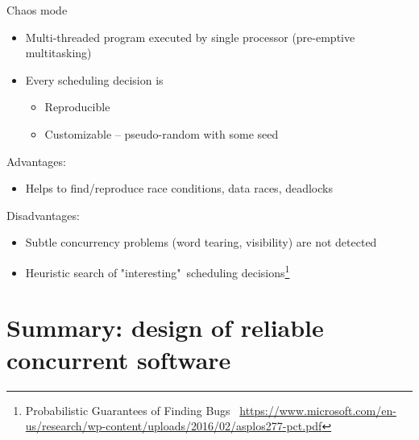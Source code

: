 \begin{frame}{Chaos mode}

\begin{itemize}
  \item Multi-threaded program executed by single processor (pre-emptive multitasking)
  \item Every scheduling decision is
  \begin{itemize}
    \item Reproducible 
    \item Customizable -- pseudo-random with some seed
  \end{itemize}
\end{itemize}

\pause
Advantages:
\begin{itemize}
  \item Helps to find/reproduce race conditions, data races, deadlocks
\end{itemize}

\pause
Disadvantages:
\begin{itemize}
  \item Subtle concurrency problems (word tearing, visibility) are not detected
  \item Heuristic search of "interesting"\ scheduling decisions\footnote{\tiny{Probabilistic Guarantees of Finding Bugs \ }\tiny\url{https://www.microsoft.com/en-us/research/wp-content/uploads/2016/02/asplos277-pct.pdf}}
\end{itemize}

\end{frame}


% 
% 
% 


\section{Summary: design of reliable concurrent software}
\showTOC

